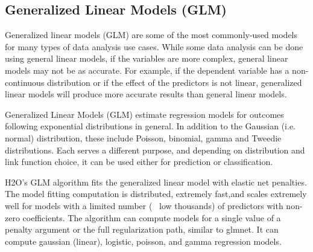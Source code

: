 \documentclass[11pt]{article}
\begin{document}
\subsection{Generalized Linear Models (GLM)}


Generalized linear models (GLM) are some of the most commonly-used models for many types of data analysis use cases. While some data analysis can be done using general linear models, if the variables are more complex, general linear models may not be as accurate. For example, if the dependent variable has a non-continuous distribution or if the effect of the predictors is not linear, generalized linear models will produce more accurate results than general linear models.  

Generalized Linear Models (GLM) estimate regression models for outcomes following exponential distributions in general. In addition to the Gaussian (i.e. normal) distribution, these include Poisson, binomial, gamma and Tweedie distributions. Each serves a different purpose, and depending on distribution and link function choice, it can be used either for prediction or classification.

H2O's GLM algorithm fits the generalized linear model with elastic net penalties. The model fitting computation is distributed, extremely fast,and scales extremely well for models with a limited number (~ low thousands) of predictors with non-zero coefficients. The algorithm can compute models for a single value of a penalty argument or the full regularization path, similar to glmnet. It can compute gaussian (linear), logistic, poisson, and gamma regression models.
\end{document}

